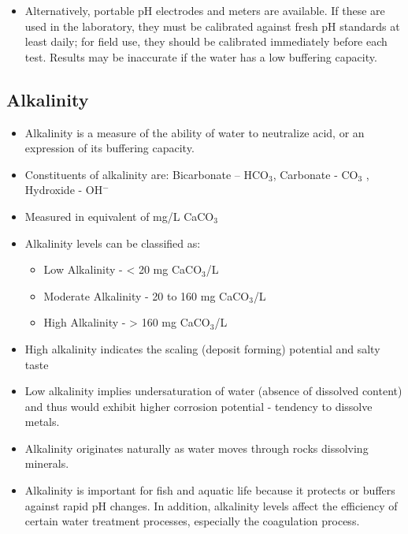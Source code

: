 \begin{itemize}
\item Alternatively, portable pH electrodes and meters are available. If these are used in the laboratory, they must be calibrated against fresh pH standards at least daily; for field use, they should be calibrated immediately before each test. Results may be inaccurate if the water has a low buffering capacity.
\end{itemize}

\subsection{Alkalinity}
\begin{itemize}
\item Alkalinity is a measure of the ability of water to neutralize acid, or an expression of its buffering capacity.
\item Constituents of alkalinity are: Bicarbonate – HCO$_3$, Carbonate - CO$_3$ , Hydroxide - OH$^-$
\item Measured in equivalent of mg/L CaCO$_3$
\item Alkalinity levels can be classified as:
\begin{itemize}
\item Low Alkalinity - < 20 mg CaCO$_3$/L
\item Moderate Alkalinity - 20 to 160 mg CaCO$_3$/L
\item High Alkalinity - > 160 mg CaCO$_3$/L
\end{itemize}
\item High alkalinity indicates the scaling (deposit forming) potential and salty taste
\item Low alkalinity implies undersaturation of water (absence of dissolved content) and thus would exhibit higher corrosion potential - tendency to dissolve metals.
\item Alkalinity originates naturally as water moves through rocks dissolving minerals.
\item Alkalinity is important for fish and aquatic life because it protects or buffers against rapid pH changes. In addition, alkalinity levels affect the efficiency of certain water treatment processes, especially the coagulation process.
\end{itemize}


